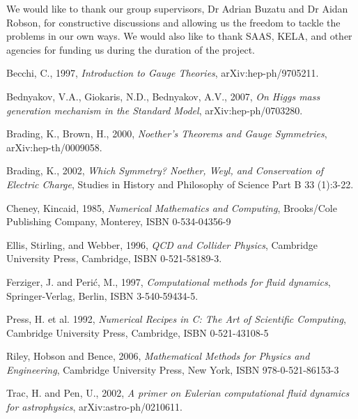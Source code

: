 \documentclass[aps,twocolumn,pre,nofootinbib,10pt]{revtex4-1}
\begin{document}
\begin{acknowledgments}
We would like to thank our group supervisors, Dr Adrian Buzatu and Dr Aidan Robson, for constructive discussions and allowing us the freedom to tackle the problems in our own ways. We would also like to thank SAAS, KELA, and other agencies for funding us during the duration of the project.
\end{acknowledgments}

\begin{thebibliography}{5}

 Becchi, C., 1997, \emph{Introduction to Gauge Theories}, arXiv:hep-ph/9705211.

 Bednyakov, V.A., Giokaris, N.D., Bednyakov, A.V., 2007, \emph{On Higgs mass generation mechanism in the Standard Model}, 	arXiv:hep-ph/0703280.

 Brading, K., Brown, H., 2000, \emph{Noether's Theorems and Gauge Symmetries}, arXiv:hep-th/0009058.

 Brading, K., 2002, \emph{Which Symmetry? Noether, Weyl, and Conservation of Electric Charge}, Studies in History and Philosophy of Science Part B 33 (1):3-22.

 Cheney, Kincaid, 1985, \emph{Numerical Mathematics and Computing}, Brooks/Cole Publishing Company, Monterey, ISBN 0-534-04356-9

 Ellis, Stirling, and Webber, 1996, \emph{QCD and Collider Physics}, Cambridge University Press, Cambridge, ISBN 0-521-58189-3.

 Ferziger, J. and Peri\'c, M., 1997, \emph{Computational methods for fluid dynamics}, Springer-Verlag, Berlin, ISBN 3-540-59434-5.


 Press, H. et al. 1992, \emph{Numerical Recipes in C: The Art of Scientific Computing}, Cambridge University Press, Cambridge, ISBN 0-521-43108-5

 Riley, Hobson and Bence, 2006, \emph{Mathematical Methods for Physics and Engineering}, Cambridge University Press, New York, ISBN 978-0-521-86153-3

 Trac, H. and Pen, U., 2002, \emph{A primer on Eulerian computational fluid dynamics for astrophysics}, arXiv:astro-ph/0210611.



\end{thebibliography}



\end{document}
